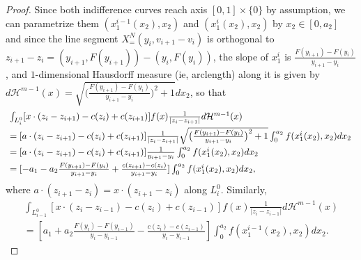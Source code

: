 \documentclass[12pt,reqno]{amsart}
\begin{document}
\begin{proof}
Since both indifference curves reach axis $ [0,1]\times\{0\} $ by assumption, we can parametrize them  $(x^{i-1}_1(x_2),x_2)$ and $(x^i_1(x_2),x_2)$ by $x_ 2 \in [0,a_2]$ and since the line segment $X^N_=(y_i, v_{i+1} - v_{i})$ is orthogonal to $z_{i+1}-z_i =( y_{i+1},F(y_{i+1})) -(y_{i},F(y_{i})) $, the slope of $x_1^i$ is $\frac{F(y_{i+1})-F(y_i)}{y_{i+1} -y_i}$, and $1$-dimensional Hausdorff measure (ie, arclength) along it is given by $d\mathcal H^{m-1}(x) = \sqrt{\big(\frac{F(y_{i+1})-F(y_i)}{y_{i+1} -y_i}\big)^2+1}dx_2$, so that 
\[\hspace{-0.4cm}\begin{array}{ll}
&\int_{L_i^0}[x \cdot (z_{i}-z_{i+1})-c(z_{i}) +c(z_{i+1}) ]f(x)\frac{1}{|z_i-z_{i+1}|}d\mathcal H^{m-1}(x)\vspace{3pt}\\
&=[a \cdot (z_{i}-z_{i+1})-c(z_{i}) +c(z_{i+1}) ]\frac{1}{|z_i-z_{i+1}|}\sqrt{\big(\frac{F(y_{i+1})-F(y_i)}{y_{i+1} -y_i}\big)^2+1}\int_0^{a_2} f(x^i_1(x_2),x_2)dx_2\vspace{3pt}\\
&=[a \cdot (z_{i}-z_{i+1})-c(z_{i}) +c(z_{i+1}) ]\frac{1}{y_{i+1}-y_{i}}\int_0^{a_2} f(x^i_1(x_2),x_2)dx_2\vspace{3pt}\\
&= [-a_1 -a_2 \frac{F(y_{i+1})-F(y_i)}{y_{i+1}-y_{i}} +\frac{c(z_{i+1}) -c(z_{i})}{y_{i+1}-y_{i}}]\int_0^{a_2} f(x^i_1(x_2),x_2)dx_2,
\end{array}\]
where  $a\cdot(z_{i+1}-z_{i})=x\cdot(z_{i+1}-z_{i})$ along $L_i^0.$
Similarly,
\begin{eqnarray*}
\int_{L^0_{i-1}}[x \cdot (z_{i}-z_{i-1})-c(z_i) + c(z_{i-1}) ]f(x)\frac{1}{|z_i-z_{i-1}|}d\mathcal H^{m-1}(x)\\
=[a_1 +a_2 \frac{F(y_{i})-F(y_{i-1})}{y_{i}-y_{i-1}} -\frac{c(z_{i}) -c(z_{i-1})}{y_{i}-y_{i-1}}]\int_0^{a_2} f(x_1^{i-1}(x_2),x_2)dx_2.
\end{eqnarray*}



\end{proof}
\end{document}
